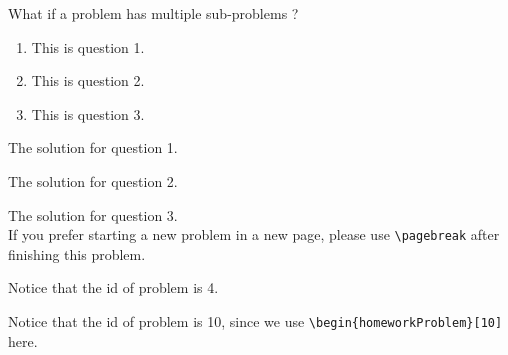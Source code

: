 \documentclass[UTF8]{homework}
\begin{document}
%
%
\begin{homeworkProblem}
    What if a problem has multiple sub-problems ?

    \begin{enumerate}[(1)]
        \item This is question 1.
        \item This is question 2.
        \item This is question 3.
    \end{enumerate}

    \solution[1]
    The solution for question 1.
    
    \solution[2]
    The solution for question 2.

    \solution[3]
    The solution for question 3.\\

    If you prefer starting a new problem in a new page, please use \verb|\pagebreak| after finishing this problem.

\end{homeworkProblem}


\pagebreak


%
%
\begin{homeworkProblem}
    Notice that the id of problem is 4.
\end{homeworkProblem}


%
%
\begin{homeworkProblem}[10]
    Notice that the id of problem is 10, since we use \verb|\begin{homeworkProblem}[10]| here.
\end{homeworkProblem}
\end{document}
